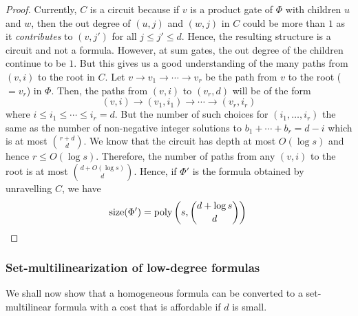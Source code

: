 \begin{proof}
\medskip

Currently, $C$ is a circuit because if $v$ is a product gate of $\Phi$ with children $u$ and $w$, then the out degree of $(u, j)$ and $(w, j)$ in $C$ could be more than $1$ as it \emph{contributes} to $(v,j')$ for all $j \leq j' \leq d$.
Hence, the resulting structure is a circuit and not a formula.
However, at sum gates, the out degree of the children continue to be $1$.
But this gives us a good understanding of the many paths from $(v,i)$ to the root in $C$.
Let $v\rightarrow v_1 \rightarrow \cdots \rightarrow v_r$ be the path from $v$ to the root ($=v_r$) in $\Phi$. Then, the paths from $(v,i)$ to $(v_r,d)$ will be of the form
\[
(v,i) \rightarrow (v_1,i_1) \rightarrow \cdots \rightarrow (v_r,i_r)
\]
where $i \leq i_1 \leq \cdots \leq i_r = d$.
But the number of such choices for $(i_1,\ldots, i_r)$ the same as the number of non-negative integer solutions to $b_1 + \cdots + b_r = d-i$ which is at most $\binom{r + d}{d}$.
We know that the circuit has depth at most $O(\log s)$ and hence $r \leq O(\log s)$.
Therefore, the number of paths from any $(v,i)$ to the root is at most $\binom{d + O(\log s)}{d}$.
Hence, if $\Phi'$ is the formula obtained by unravelling $C$, we have
\[
\mathrm{size}(\Phi') = \operatorname{poly}\left(s,\binom{d+\log s}{d}\right)\qedhere
\]
\end{proof}

\subsubsection*{Set-multilinearization of low-degree formulas}

We shall now show that a homogeneous formula can be converted to a set-multilinear formula with a cost that is affordable if $d$ is small. 

